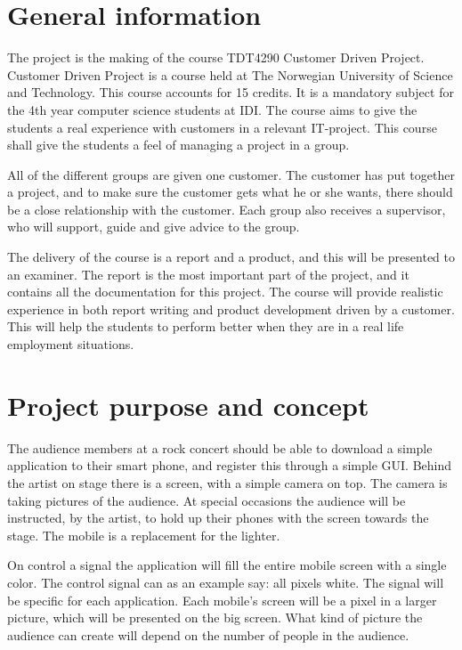 \section{General information}

The project is the making of the course TDT4290 Customer Driven Project. 
Customer Driven Project is a course held at The Norwegian University of Science and Technology.
This course accounts for 15 credits. 
It is a mandatory subject for the 4th year computer science students at IDI. 
The course aims to give the students a real experience with customers in a relevant IT-project. 
This course shall give the students a feel of managing a project in a group. 


All of the different groups are given one customer. 
The customer has put together a project, and to make sure the customer gets what he or she wants, there should be a close relationship with the customer.
Each group also receives a supervisor, who will support, guide and give advice to the group. 

The delivery of the course is a report and a product, and this will be presented to an examiner. 
The report is the most important part of the project, and it contains all the documentation for this project. The course will provide realistic experience in both report writing and product development driven by a customer. 
This will help the students to perform better when they are in a real life employment situations.


\section{Project purpose and concept}
The audience members at a rock concert should be able to download a simple application to their smart phone, and register this through a simple GUI.
Behind the artist on stage there is a screen, with a simple camera on top. 
The camera is taking pictures of the audience. 
At special occasions the audience will be instructed, by the artist, to hold up their phones with the screen towards the stage. 
The mobile is a replacement for the lighter.  

On control a signal the application will fill the entire mobile screen with a single color.
The control signal can as an example say: all pixels white.
The signal will be specific for each application.
Each mobile's screen will be a pixel in a larger picture, which will be presented on the big screen. 
What kind of picture the audience can create will depend on the number of people in the audience. 

